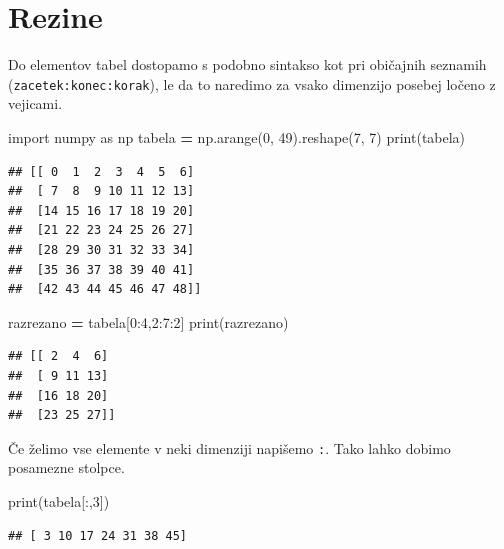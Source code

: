 \documentclass[
]{report}
\newenvironment{Shaded}{\begin{snugshade}}{\end{snugshade}}
\newcommand{\BuiltInTok}[1]{#1}
\newcommand{\DecValTok}[1]{\textcolor[rgb]{0.00,0.00,0.81}{#1}}
\newcommand{\ImportTok}[1]{#1}
\newcommand{\NormalTok}[1]{#1}
\newcommand{\OperatorTok}[1]{\textcolor[rgb]{0.81,0.36,0.00}{\textbf{#1}}}
\begin{document}
\hypertarget{rezine}{%
\section{Rezine}\label{rezine}}

Do elementov tabel dostopamo s podobno sintakso kot pri običajnih seznamih
(\texttt{zacetek:konec:korak}), le da to naredimo za vsako dimenzijo posebej ločeno z vejicami.

\begin{Shaded}
\begin{Highlighting}[]
\ImportTok{import}\NormalTok{ numpy }\ImportTok{as}\NormalTok{ np}
\NormalTok{tabela }\OperatorTok{=}\NormalTok{ np.arange(}\DecValTok{0}\NormalTok{, }\DecValTok{49}\NormalTok{).reshape(}\DecValTok{7}\NormalTok{, }\DecValTok{7}\NormalTok{)}
\BuiltInTok{print}\NormalTok{(tabela)}
\end{Highlighting}
\end{Shaded}

\begin{verbatim}
## [[ 0  1  2  3  4  5  6]
##  [ 7  8  9 10 11 12 13]
##  [14 15 16 17 18 19 20]
##  [21 22 23 24 25 26 27]
##  [28 29 30 31 32 33 34]
##  [35 36 37 38 39 40 41]
##  [42 43 44 45 46 47 48]]
\end{verbatim}

\begin{Shaded}
\begin{Highlighting}[]
\NormalTok{razrezano }\OperatorTok{=}\NormalTok{ tabela[}\DecValTok{0}\NormalTok{:}\DecValTok{4}\NormalTok{,}\DecValTok{2}\NormalTok{:}\DecValTok{7}\NormalTok{:}\DecValTok{2}\NormalTok{]}
\BuiltInTok{print}\NormalTok{(razrezano)}
\end{Highlighting}
\end{Shaded}

\begin{verbatim}
## [[ 2  4  6]
##  [ 9 11 13]
##  [16 18 20]
##  [23 25 27]]
\end{verbatim}

Če želimo vse elemente v neki dimenziji napišemo \texttt{:}. Tako lahko dobimo posamezne stolpce.

\begin{Shaded}
\begin{Highlighting}[]
\BuiltInTok{print}\NormalTok{(tabela[:,}\DecValTok{3}\NormalTok{])}
\end{Highlighting}
\end{Shaded}

\begin{verbatim}
## [ 3 10 17 24 31 38 45]
\end{verbatim}
\end{document}
